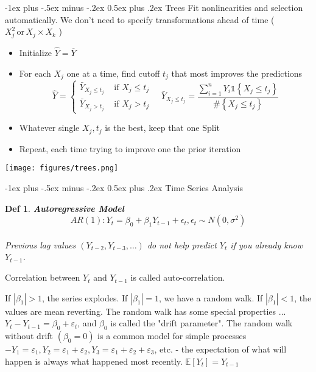 \documentclass[7pt,landscape]{article}
\makeatletter
\renewcommand{\section}{\@startsection{section}{1}{0mm}%
                                {-1ex plus -.5ex minus -.2ex}%
                                {0.5ex plus .2ex}%
                                {\large\bfseries}}
\renewcommand{\subsection}{\@startsection{subsection}{2}{0mm}%
                                {-1ex plus -.5ex minus -.2ex}%
                                {0.5ex plus .2ex}%
                                {\bfseries}}
\theoremstyle{def}
\newtheorem*{definition}{Def}%
\makeatother
\begin{document}
\begin{multicols}{3}
\subsection{Trees}
Fit nonlinearities and selection automatically. We don't need to specify transformations ahead of time ( \( X^{2}_j \,\text{or} \, X_j \times X_k \) )
\begin{itemize}
    \item Initialize \(\hat{Y} = \overline{Y} \)
    \item For each \( X_j\)  one at a time, find cutoff \( t_j \) that most improves the predictions
        \[
            \hat{Y}=\left\{\begin{array}{ll}
                \bar{Y}_{X_{j} \leq t_{j}} & \text { if } X_{j} \leq t_{j} \\
                \bar{Y}_{X_{j}>t_{j}} & \text { if } X_{j}>t_{j}
                \end{array} \quad \bar{Y}_{X_{j} \leq t_{j}}=\frac{\sum_{i=1}^{n} Y_{i} \mathds{1}\left\{X_{j} \leq t_{j}\right\}}{\#\left\{X_{j} \leq t_{j}\right\}}\right.
        \] 
    \item Whatever single \( X_j, t_j \) is the best, keep that one Split
    \item Repeat, each time trying to improve one the prior iteration 
\end{itemize}

\begin{center}
\texttt{[image: figures/trees.png]}
\end{center}
\section{Time Series Analysis}

\begin{definition}{\textbf{Autoregressive Model}}
    \[
    AR(1): Y_{t} = \beta_0 + \beta_1 Y_{t-1} + \epsilon_{t}, \epsilon_{t} \sim N(0,\sigma^2)
    \] \\

    Previous lag values $\left(Y_{t-2}, Y_{t-3}, \ldots\right)$ do not help predict $Y_{t}$ if you already know $Y_{t-1}$.
\end{definition}

Correlation between \( Y_t \) and \( Y_{t-1} \) is called auto-correlation.
\vspace{0.2cm}

If $\left|\beta_{1}\right|>1$, the series explodes.
If $\left|\beta_{1}\right|=1$, we have a random walk.
If $\left|\beta_{1}\right|<1$, the values are mean reverting.
The random walk has some special properties ... $Y_{t}-Y_{t-1}=\beta_{0}+\varepsilon_{t}$, and $\beta_{0}$ is called the "drift parameter". The random walk without drift $\left(\beta_{0}=0\right)$ is a common model for simple processes
$-Y_{1}=\varepsilon_{1}, Y_{2}=\varepsilon_{1}+\varepsilon_{2}, Y_{3}=\varepsilon_{1}+\varepsilon_{2}+\varepsilon_{3}$, etc.
- the expectation of what will happen is always what happened most recently. $\mathbb{E}\left[Y_{t}\right]=Y_{t-1}$


\end{multicols}
\end{document}
